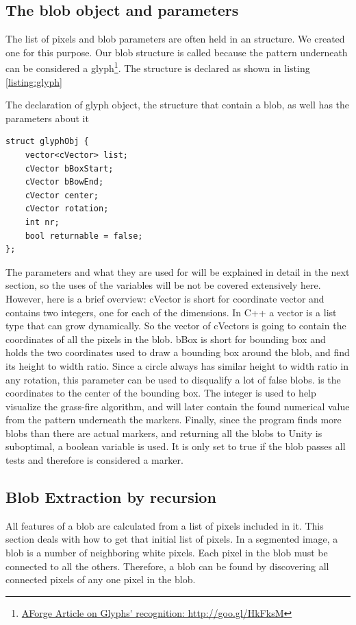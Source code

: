 {\subsection{The blob object and parameters}
The list of pixels and blob parameters are often held in an structure.
We created one for this purpose. Our blob structure is called  because the pattern underneath can be considered a glyph\footnote{\url{AForge Article on Glyphs' recognition: http://goo.gl/HkFksM}}. The structure is declared as shown in listing \ref{listing:glyph}
\begin{listing}[H]
	\caption{The declaration of glyph object, the structure that contain a blob, as well has the parameters about it}
	\begin{verbatim}
struct glyphObj {
	vector<cVector> list;
	cVector bBoxStart;
	cVector bBowEnd;
	cVector center;
	cVector rotation;
	int nr;
	bool returnable = false;
};
	\end{verbatim}
	\label{listing:glyph}
\end{listing}
The parameters and what they are used for will be explained in detail in the next section, so the uses of the variables will be not be covered extensively here. However, here is a brief overview:
cVector is short for coordinate vector and contains two integers, one for each of the dimensions. In C++ a vector is a list type that can grow dynamically. So the vector of cVectors is going to contain the coordinates of all the pixels in the blob. bBox is short for bounding box and holds the two coordinates used to draw a bounding box around the blob, and find its height to width ratio. Since a circle always has similar height to width ratio in any rotation, this parameter can be used to disqualify a lot of false blobs.  is the coordinates to the center of the bounding box.
The integer  is used to help visualize the grass-fire algorithm, and will later contain the found numerical value from the pattern underneath the markers. Finally, since the program finds more blobs than there are actual markers, and returning all the blobs to Unity is suboptimal, a boolean variable  is used. It is only set to true if the blob passes all tests and therefore is considered a marker.

\subsection{Blob Extraction by recursion}
All features of a blob are calculated from a list of pixels included in it. This section deals with how to get that initial list of pixels. In a segmented image, a blob is a number of neighboring white pixels. Each pixel in the blob must be connected to all the others. Therefore, a blob can be found by discovering all connected pixels of any one pixel in the blob.\\

}
